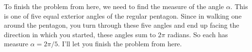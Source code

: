 \documentclass{ximera}
\begin{document}
\begin{question}
\begin{explanation}
To finish the problem from here, we need to find the measure of the angle $\alpha$. This is one of five equal exterior angles of the regular pentagon. Since in walking one around the pentagon, you turn through these five angles and end up facing the direction in which you started, these angles sum to $2\pi$ radians. So each has measure $\alpha =2\pi/5$. I'll let you finish the problem from here.

\end{explanation}

\end{question}
\end{document}
